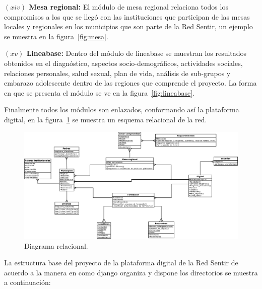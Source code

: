 \documentclass[journal,transmag]{IEEEtran}
\begin{document}
\textbf{$(xiv)$ Mesa regional:} El módulo de mesa regional relaciona todos los compromisos a los que se llegó con las instituciones que participan de las mesas locales y regionales en los municipios que son parte de la Red Sentir, un ejemplo se muestra en la figura~\ref{fig:mesa}.

\textbf{$(xv)$ Lineabase:} Dentro del módulo de lineabase se muestran los resultados obtenidos en el diagnóstico, aspectos socio-demográficos, actividades sociales, relaciones personales, salud sexual, plan de vida, análisis de sub-grupos y embarazo adolescente dentro de las regiones que comprende el proyecto. La forma en que se presenta el módulo se ve en la figura~\ref{fig:lineabase}.

Finalmente todos los módulos son enlazados, conformando así la plataforma digital, en la figura~\ref{fig:red} se muestra un esquema relacional de la red.

\begin{figure}[t]
\centering
\includegraphics[width=1\linewidth]{red.eps}
\caption{Diagrama relacional.}
\label{fig:red}
\end{figure}

La estructura base del proyecto de la plataforma digital de la Red Sentir de acuerdo a la manera en como django organiza y dispone los directorios se muestra a continuación:
\end{document}
